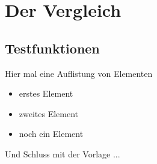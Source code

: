 \chapter{Der Vergleich}
\section{Testfunktionen}

Hier mal eine Auflistung von Elementen
\begin{itemize}
 \item erstes Element
 \item zweites Element
 \item noch ein Element
\end{itemize}

Und Schluss mit der Vorlage ...
